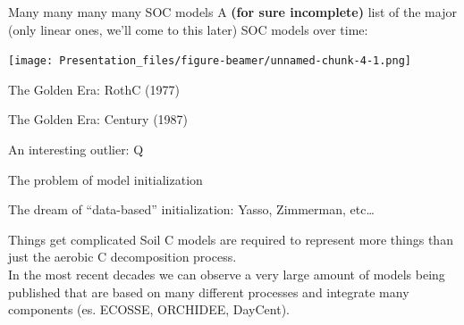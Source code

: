 \documentclass[
  ignorenonframetext,
]{beamer}
\begin{document}
\begin{frame}{Many many many many SOC models}
\protect\hypertarget{many-many-many-many-soc-models}{}
A \textbf{(for sure incomplete)} list of the major (only linear ones,
we'll come to this later) SOC models over time:

\texttt{[image: Presentation\_files/figure-beamer/unnamed-chunk-4-1.png]}
\end{frame}

\begin{frame}{The Golden Era: RothC (1977)}
\protect\hypertarget{the-golden-era-rothc-1977}{}
\end{frame}

\begin{frame}{The Golden Era: Century (1987)}
\protect\hypertarget{the-golden-era-century-1987}{}
\end{frame}

\begin{frame}{An interesting outlier: Q}
\protect\hypertarget{an-interesting-outlier-q}{}
\end{frame}

\begin{frame}{The problem of model initialization}
\protect\hypertarget{the-problem-of-model-initialization}{}
\end{frame}

\begin{frame}{The dream of ``data-based'' initialization: Yasso,
Zimmerman, etc\ldots{}}
\protect\hypertarget{the-dream-of-data-based-initialization-yasso-zimmerman-etc}{}
\end{frame}

\begin{frame}{Things get complicated}
\protect\hypertarget{things-get-complicated}{}
Soil C models are required to represent more things than just the
aerobic C decomposition process.\\
In the most recent decades we can observe a very large amount of models
being published that are based on many different processes and integrate
many components (es. ECOSSE, ORCHIDEE, DayCent).
\end{frame}
\end{document}
